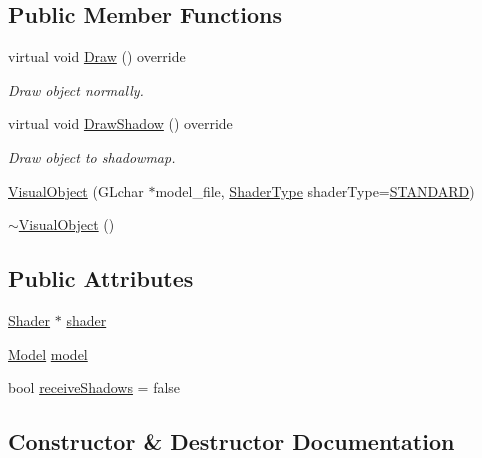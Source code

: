\subsection*{Public Member Functions}
\begin{DoxyCompactItemize}
\item 
virtual void \mbox{\hyperlink{class_visual_object_a10c0e01e375fd4af08e57f3475dd312c}{Draw}} () override
\begin{DoxyCompactList}\small\item\em Draw object normally. \end{DoxyCompactList}\item 
virtual void \mbox{\hyperlink{class_visual_object_a88e778dc97ad93cefd5193d6899d6c82}{Draw\+Shadow}} () override
\begin{DoxyCompactList}\small\item\em Draw object to shadowmap. \end{DoxyCompactList}\item 
\mbox{\hyperlink{class_visual_object_acae4022cf0fa793dfba4ea5a91b9d242}{Visual\+Object}} (G\+Lchar $\ast$model\+\_\+file, \mbox{\hyperlink{_game_object_8h_a6230e1b9ecbf2d82d10856fd7e1fde46}{Shader\+Type}} shader\+Type=\mbox{\hyperlink{_texture_8h_a65468556d79304b3a4bfc464cc12e549a94e94133f4bdc1794c6b647b8ea134d0}{S\+T\+A\+N\+D\+A\+RD}})
\item 
\mbox{\hyperlink{class_visual_object_a068ba11545322d81d9ad8c675c4233f9}{$\sim$\+Visual\+Object}} ()
\end{DoxyCompactItemize}
\subsection*{Public Attributes}
\begin{DoxyCompactItemize}
\item 
\mbox{\hyperlink{class_shader}{Shader}} $\ast$ \mbox{\hyperlink{class_visual_object_a6d00e06796983b19f57d6fd86b202902}{shader}}
\item 
\mbox{\hyperlink{class_model}{Model}} \mbox{\hyperlink{class_visual_object_a325fec77ff1a5441f1ff4ffa98e508c8}{model}}
\item 
bool \mbox{\hyperlink{class_visual_object_af54b3c823b3ca24736faeedc88ef90f3}{receive\+Shadows}} = false
\end{DoxyCompactItemize}


\subsection{Constructor \& Destructor Documentation}
\mbox{\label{class_visual_object_acae4022cf0fa793dfba4ea5a91b9d242}} 
